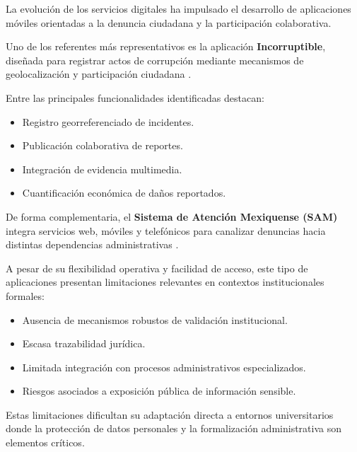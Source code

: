 \begin{flushleft}
\justifying

La evolución de los servicios digitales ha impulsado el desarrollo de aplicaciones móviles orientadas a la denuncia ciudadana y la participación colaborativa.

Uno de los referentes más representativos es la aplicación \textbf{Incorruptible}, diseñada para registrar actos de corrupción mediante mecanismos de geolocalización y participación ciudadana \cite{13}.

Entre las principales funcionalidades identificadas destacan:

\begin{itemize}

    \item Registro georreferenciado de incidentes.
    \item Publicación colaborativa de reportes.
    \item Integración de evidencia multimedia.
    \item Cuantificación económica de daños reportados.

\end{itemize}

De forma complementaria, el \textbf{Sistema de Atención Mexiquense (SAM)} integra servicios web, móviles y telefónicos para canalizar denuncias hacia distintas dependencias administrativas \cite{14}.

A pesar de su flexibilidad operativa y facilidad de acceso, este tipo de aplicaciones presentan limitaciones relevantes en contextos institucionales formales:

\begin{itemize}

    \item Ausencia de mecanismos robustos de validación institucional.
    \item Escasa trazabilidad jurídica.
    \item Limitada integración con procesos administrativos especializados.
    \item Riesgos asociados a exposición pública de información sensible.

\end{itemize}

Estas limitaciones dificultan su adaptación directa a entornos universitarios donde la protección de datos personales y la formalización administrativa son elementos críticos.

\end{flushleft}

